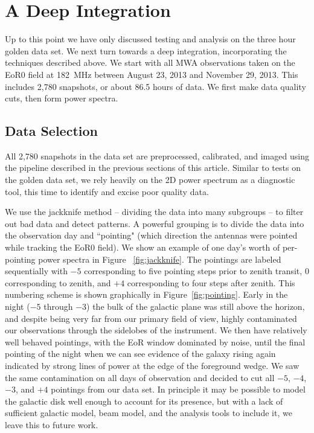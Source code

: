 \documentclass[iop]{emulateapj}
\begin{document}
\section{A Deep Integration}\label{sec:deep}
Up to this point we have only discussed testing and analysis on the three hour golden data 
set. We next turn towards a deep integration, incorporating the techniques described above. 
We start with all MWA observations taken on the EoR0 field at 182~MHz between August 
23, 2013 and November 29, 2013. This includes 2,780 snapshots, or about 86.5 hours of 
data. We first make data quality cuts, then form power spectra.

\subsection{Data Selection}\label{sec:selection}
All 2,780 snapshots in the data set are preprocessed, calibrated, and imaged using the 
pipeline described in the previous sections of this article. Similar to tests on the golden data 
set, we rely heavily on the 2D power spectrum as a diagnostic tool, this time to identify and 
excise poor quality data.

We use the jackknife method -- dividing the data into many subgroups -- to filter out bad 
data and detect patterns. A powerful grouping is to divide the data into the observation day 
and ``pointing" (which direction the antennas were pointed while tracking the EoR0 field). 
We show an example of one day's worth of per-pointing power spectra in Figure~
\ref{fig:jackknife}. The pointings are labeled sequentially with $-5$ corresponding to five 
pointing steps prior to zenith transit, $0$ corresponding to zenith, and $+4$ corresponding 
to four steps after zenith. 
This numbering scheme is shown graphically in Figure~\ref{fig:pointing}.
Early in the night ($-5$ through $-3$) the bulk of the galactic plane 
was still above the horizon, and despite being very far from our primary field of view, highly 
contaminated our observations through the sidelobes of the instrument. We then have 
relatively well behaved pointings, with the EoR window dominated by noise, until the final 
pointing of the night when we can see evidence of the galaxy rising again indicated by 
strong lines of power at the edge of the foreground wedge. We saw the same contamination 
on all days of observation and decided to cut all $-5$, $-4$, $-3$, and $+4$ pointings from 
our data set. In principle it may be possible to model the galactic disk well enough to 
account for its presence, but with a lack of sufficient galactic model, beam model, and the 
analysis tools to include it, we leave this to future work.
\end{document}
